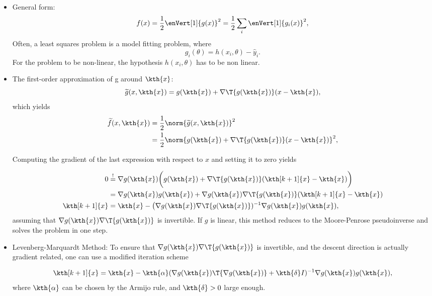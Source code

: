 \documentclass[12pt,a4paper]{article}
\begin{document}
\begin{itemize}
    \item General form:
        \begin{equation*}
          f(x) = \frac{1}{2} \enVert[1]{g(x)}^2 = \frac{1}{2} \sum_i \enVert[1]{g_i(x)}^2,
        \end{equation*}
        Often, a least squares problem is a model fitting problem, where
        \begin{equation*}
          g_i(\theta) = h(x_i, \theta) - \hat{y}_i.
        \end{equation*}
    For the problem to be non-linear, the hypothesis $h(x_i, \theta)$ has to be non linear.
    
    \item The first-order approximation of g around $\kth{x}$:
        \begin{equation*}
         \widetilde{g}(x,\kth{x})=g(\kth{x}) + \nabla \T{g(\kth{x})} (x-\kth{x}),
        \end{equation*}
        which yields
        \begin{align*}
            \widetilde{f}(x,\kth{x}) &= \dfrac{1}{2} \norm{\widetilde{g}(x,\kth{x})}^2 
            \\ &=   \dfrac{1}{2} \norm{ g(\kth{x}) + \nabla \T{g(\kth{x})}(x-\kth{x})}^2,
        \end{align*}
        
        Computing the gradient of the last expression with respect to $x$ and setting it to zero yields
        
        \begin{align*}
            0 &\overset{!}{=}  \nabla g(\kth{x})\biggl(g(\kth{x}) +
                 \nabla \T{g(\kth{x})} (\kth[k+1]{x} - \kth{x})\biggr)
            \\ &= \nabla g(\kth{x})g(\kth{x}) +
                 \nabla g(\kth{x})\nabla \T{g(\kth{x})} (\kth[k+1]{x} - \kth{x})
            \\ \kth[k+1]{x} &= \kth{x} - \bigl ( \nabla g(\kth{x} ) \nabla \T{g(\kth{x})})^{-1}\nabla g(\kth{x})g(\kth{x}),
        \end{align*}
        assuming that $\nabla g(\kth{x})\nabla \T{g(\kth{x})}$ is invertible. If $g$ is linear, this method reduces
    to the Moore-Penrose pseudoinverse and solves the problem in one step.
    \item Levenberg-Marquardt Method: 
        To ensure that $\nabla g(\kth{x}) \nabla \T{g(\kth{x})}$ is invertible, and the descent direction is actually gradient related, one can use a modified iteration scheme

        \begin{equation*}
            \kth[k+1]{x} = \kth{x} - \kth{\alpha}(\nabla g( \kth{x}) \T{\nabla g( \kth{x})} + \kth{\delta}I)^{-1} \nabla g(\kth{x})g(\kth{x}),
        \end{equation*}
        where $\kth{\alpha}$ can be chosen by the Armijo rule, and $ \kth{\delta} > 0$ large enough.
\end{itemize}
\end{document}
